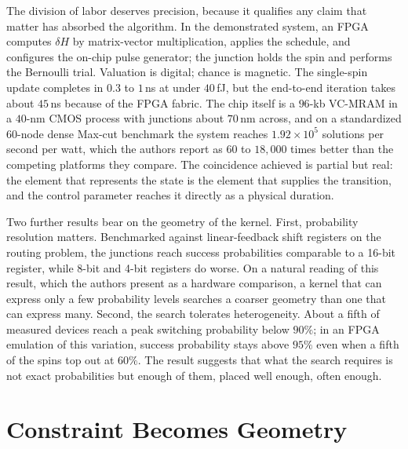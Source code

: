\documentclass[11pt]{article}
\theoremstyle{definition}
\theoremstyle{remark}
\begin{document}
The division of labor deserves precision, because it qualifies any claim that matter has absorbed the algorithm. In the demonstrated system, an FPGA computes $\delta H$ by matrix-vector multiplication, applies the schedule, and configures the on-chip pulse generator; the junction holds the spin and performs the Bernoulli trial. Valuation is digital; chance is magnetic. The single-spin update completes in $0.3$ to $1$\,ns at under $40$\,fJ, but the end-to-end iteration takes about $45$\,ns because of the FPGA fabric. The chip itself is a $96$-kb VC-MRAM in a $40$-nm CMOS process with junctions about $70$\,nm across, and on a standardized 60-node dense Max-cut benchmark the system reaches $1.92 \times 10^5$ solutions per second per watt, which the authors report as $60$ to $18{,}000$ times better than the competing platforms they compare. The coincidence achieved is partial but real: the element that represents the state is the element that supplies the transition, and the control parameter reaches it directly as a physical duration.

Two further results bear on the geometry of the kernel. First, probability resolution matters. Benchmarked against linear-feedback shift registers on the routing problem, the junctions reach success probabilities comparable to a 16-bit register, while 8-bit and 4-bit registers do worse. On a natural reading of this result, which the authors present as a hardware comparison, a kernel that can express only a few probability levels searches a coarser geometry than one that can express many. Second, the search tolerates heterogeneity. About a fifth of measured devices reach a peak switching probability below $90\%$; in an FPGA emulation of this variation, success probability stays above $95\%$ even when a fifth of the spins top out at $60\%$. The result suggests that what the search requires is not exact probabilities but enough of them, placed well enough, often enough.

\section{Constraint Becomes Geometry}
\end{document}
